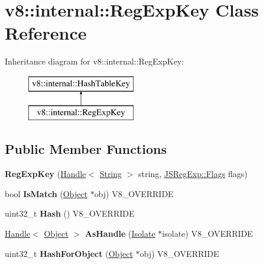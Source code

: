 \hypertarget{classv8_1_1internal_1_1_reg_exp_key}{}\section{v8\+:\+:internal\+:\+:Reg\+Exp\+Key Class Reference}
\label{classv8_1_1internal_1_1_reg_exp_key}
Inheritance diagram for v8\+:\+:internal\+:\+:Reg\+Exp\+Key\+:\begin{figure}[H]
\begin{center}
\leavevmode
\includegraphics[height=2.000000cm]{classv8_1_1internal_1_1_reg_exp_key}
\end{center}
\end{figure}
\subsection*{Public Member Functions}
\begin{DoxyCompactItemize}
\item 
\hypertarget{classv8_1_1internal_1_1_reg_exp_key_a246a71b4ad1895699c71d654d56083b3}{}{\bfseries Reg\+Exp\+Key} (\hyperlink{classv8_1_1internal_1_1_handle}{Handle}$<$ \hyperlink{classv8_1_1internal_1_1_string}{String} $>$ string, \hyperlink{classv8_1_1internal_1_1_j_s_reg_exp_1_1_flags}{J\+S\+Reg\+Exp\+::\+Flags} flags)\label{classv8_1_1internal_1_1_reg_exp_key_a246a71b4ad1895699c71d654d56083b3}

\item 
\hypertarget{classv8_1_1internal_1_1_reg_exp_key_a5e4b3ba64e9e0b26382b6293c3c330f7}{}bool {\bfseries Is\+Match} (\hyperlink{classv8_1_1internal_1_1_object}{Object} $\ast$obj) V8\+\_\+\+O\+V\+E\+R\+R\+I\+D\+E\label{classv8_1_1internal_1_1_reg_exp_key_a5e4b3ba64e9e0b26382b6293c3c330f7}

\item 
\hypertarget{classv8_1_1internal_1_1_reg_exp_key_abe5a6dcc2aa8b5217b357bc521bbc272}{}uint32\+\_\+t {\bfseries Hash} () V8\+\_\+\+O\+V\+E\+R\+R\+I\+D\+E\label{classv8_1_1internal_1_1_reg_exp_key_abe5a6dcc2aa8b5217b357bc521bbc272}

\item 
\hypertarget{classv8_1_1internal_1_1_reg_exp_key_a0effd355728af598ae79bf13fd8b0bde}{}\hyperlink{classv8_1_1internal_1_1_handle}{Handle}$<$ \hyperlink{classv8_1_1internal_1_1_object}{Object} $>$ {\bfseries As\+Handle} (\hyperlink{classv8_1_1internal_1_1_isolate}{Isolate} $\ast$isolate) V8\+\_\+\+O\+V\+E\+R\+R\+I\+D\+E\label{classv8_1_1internal_1_1_reg_exp_key_a0effd355728af598ae79bf13fd8b0bde}

\item 
\hypertarget{classv8_1_1internal_1_1_reg_exp_key_a2f3834786a58c570261c62190db5d1db}{}uint32\+\_\+t {\bfseries Hash\+For\+Object} (\hyperlink{classv8_1_1internal_1_1_object}{Object} $\ast$obj) V8\+\_\+\+O\+V\+E\+R\+R\+I\+D\+E\label{classv8_1_1internal_1_1_reg_exp_key_a2f3834786a58c570261c62190db5d1db}

\end{DoxyCompactItemize}
